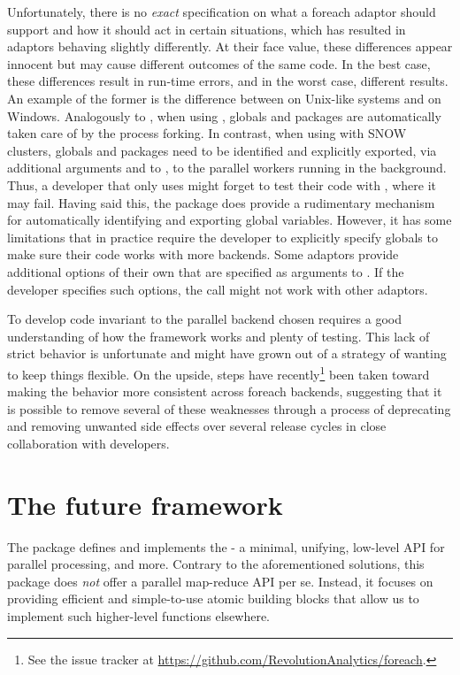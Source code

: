 Unfortunately, there is no \emph{exact} specification on what a
foreach adaptor should support and how it should act in certain
situations, which has resulted in adaptors behaving slightly
differently. At their face value, these differences appear innocent
but may cause different outcomes of the same code. In the best case,
these differences result in run-time errors, and in the worst case,
different results. An example of the former is the difference
between  on Unix-like systems and  on
Windows. Analogously to , when using ,
globals and packages are automatically taken care of by the process
forking. In contrast, when using  with SNOW clusters,
globals and packages need to be identified and explicitly exported,
via additional arguments  and 
to , to the parallel workers running in the
background.  Thus, a developer that only uses  might forget
to test their code with , where it may fail.  Having
said this, the  package does provide a rudimentary
mechanism for automatically identifying and exporting global
variables.  However, it has some limitations that in practice require
the developer to explicitly specify globals to make sure their code
works with more backends.  Some adaptors provide additional options of
their own that are specified as arguments to . If the
developer specifies such options, the  call might not
work with other adaptors.

To develop  code invariant to the parallel backend
chosen requires a good understanding of how the 
framework works and plenty of testing. This lack of strict behavior is
unfortunate and might have grown out of a strategy of wanting to keep
things flexible. On the upside, steps have recently\footnote{See
the  issue tracker
at \url{https://github.com/RevolutionAnalytics/foreach}.}
been taken toward making the behavior more consistent across foreach
backends, suggesting that it is possible to remove several of these
weaknesses through a process of deprecating and removing unwanted side
effects over several release cycles in close collaboration with
developers.


\section{The future framework}

The  package defines and implements the  -
a minimal, unifying, low-level API for parallel processing, and more.
Contrary to the aforementioned solutions, this package does \emph{not}
offer a parallel map-reduce API per se.  Instead, it focuses on
providing efficient and simple-to-use atomic building blocks that
allow us to implement such higher-level functions elsewhere.


